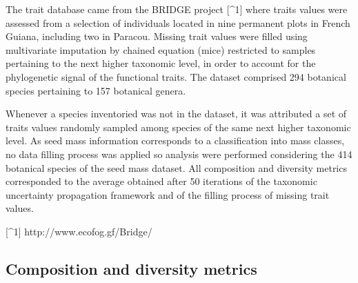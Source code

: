 \documentclass[fleqn,10pt]{ArtEcoFoG} %
\theoremstyle{definition}
\theoremstyle{definition}
\theoremstyle{definition}
\theoremstyle{remark}
\begin{document}
The trait database came from the BRIDGE project {[}\^{}1{]} where traits
values were assessed from a selection of individuals located in nine
permanent plots in French Guiana, including two in Paracou. Missing
trait values were filled using multivariate imputation by chained
equation (mice) restricted to samples pertaining to the next higher
taxonomic level, in order to account for the phylogenetic signal of the
functional traits. The dataset comprised 294 botanical species
pertaining to 157 botanical genera.

Whenever a species inventoried was not in the dataset, it was attributed
a set of traits values randomly sampled among species of the same next
higher taxonomic level. As seed mass information corresponds to a
classification into mass classes, no data filling process was applied so
analysis were performed considering the 414 botanical species of the
seed mass dataset. All composition and diversity metrics corresponded to
the average obtained after 50 iterations of the taxonomic uncertainty
propagation framework and of the filling process of missing trait
values.

{[}\^{}1{]} http://www.ecofog.gf/Bridge/

\subsection{Composition and diversity
metrics}\label{composition-and-diversity-metrics}
\end{document}
